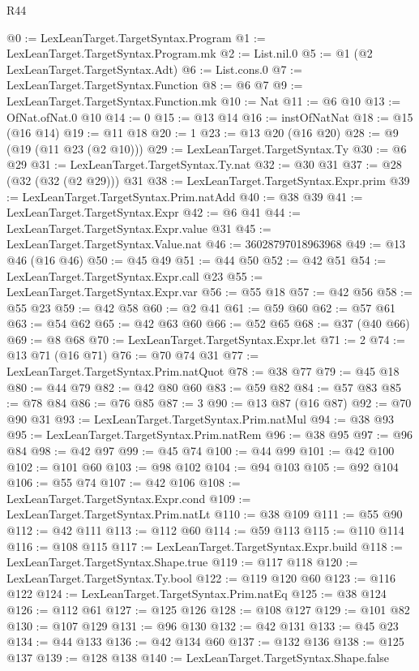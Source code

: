\begin{lexlean}{R44}
\begin{coremodule}
@0 := LexLeanTarget.TargetSyntax.Program
@1 := LexLeanTarget.TargetSyntax.Program.mk
@2 := List.nil.{0}
@5 := @1 (@2 LexLeanTarget.TargetSyntax.Adt)
@6 := List.cons.{0}
@7 := LexLeanTarget.TargetSyntax.Function
@8 := @6 @7
@9 := LexLeanTarget.TargetSyntax.Function.mk
@10 := Nat
@11 := @6 @10
@13 := OfNat.ofNat.{0} @10
@14 := 0
@15 := @13 @14
@16 := instOfNatNat
@18 := @15 (@16 @14)
@19 := @11 @18
@20 := 1
@23 := @13 @20 (@16 @20)
@28 := @9 (@19 (@11 @23 (@2 @10)))
@29 := LexLeanTarget.TargetSyntax.Ty
@30 := @6 @29
@31 := LexLeanTarget.TargetSyntax.Ty.nat
@32 := @30 @31
@37 := @28 (@32 (@32 (@2 @29))) @31
@38 := LexLeanTarget.TargetSyntax.Expr.prim
@39 := LexLeanTarget.TargetSyntax.Prim.natAdd
@40 := @38 @39
@41 := LexLeanTarget.TargetSyntax.Expr
@42 := @6 @41
@44 := LexLeanTarget.TargetSyntax.Expr.value @31
@45 := LexLeanTarget.TargetSyntax.Value.nat
@46 := 36028797018963968
@49 := @13 @46 (@16 @46)
@50 := @45 @49
@51 := @44 @50
@52 := @42 @51
@54 := LexLeanTarget.TargetSyntax.Expr.call @23
@55 := LexLeanTarget.TargetSyntax.Expr.var
@56 := @55 @18
@57 := @42 @56
@58 := @55 @23
@59 := @42 @58
@60 := @2 @41
@61 := @59 @60
@62 := @57 @61
@63 := @54 @62
@65 := @42 @63 @60
@66 := @52 @65
@68 := @37 (@40 @66)
@69 := @8 @68
@70 := LexLeanTarget.TargetSyntax.Expr.let
@71 := 2
@74 := @13 @71 (@16 @71)
@76 := @70 @74 @31
@77 := LexLeanTarget.TargetSyntax.Prim.natQuot
@78 := @38 @77
@79 := @45 @18
@80 := @44 @79
@82 := @42 @80 @60
@83 := @59 @82
@84 := @57 @83
@85 := @78 @84
@86 := @76 @85
@87 := 3
@90 := @13 @87 (@16 @87)
@92 := @70 @90 @31
@93 := LexLeanTarget.TargetSyntax.Prim.natMul
@94 := @38 @93
@95 := LexLeanTarget.TargetSyntax.Prim.natRem
@96 := @38 @95
@97 := @96 @84
@98 := @42 @97
@99 := @45 @74
@100 := @44 @99
@101 := @42 @100
@102 := @101 @60
@103 := @98 @102
@104 := @94 @103
@105 := @92 @104
@106 := @55 @74
@107 := @42 @106
@108 := LexLeanTarget.TargetSyntax.Expr.cond
@109 := LexLeanTarget.TargetSyntax.Prim.natLt
@110 := @38 @109
@111 := @55 @90
@112 := @42 @111
@113 := @112 @60
@114 := @59 @113
@115 := @110 @114
@116 := @108 @115
@117 := LexLeanTarget.TargetSyntax.Expr.build
@118 := LexLeanTarget.TargetSyntax.Shape.true
@119 := @117 @118
@120 := LexLeanTarget.TargetSyntax.Ty.bool
@122 := @119 @120 @60
@123 := @116 @122
@124 := LexLeanTarget.TargetSyntax.Prim.natEq
@125 := @38 @124
@126 := @112 @61
@127 := @125 @126
@128 := @108 @127
@129 := @101 @82
@130 := @107 @129
@131 := @96 @130
@132 := @42 @131
@133 := @45 @23
@134 := @44 @133
@136 := @42 @134 @60
@137 := @132 @136
@138 := @125 @137
@139 := @128 @138
@140 := LexLeanTarget.TargetSyntax.Shape.false

\end{coremodule}
\end{lexlean}

